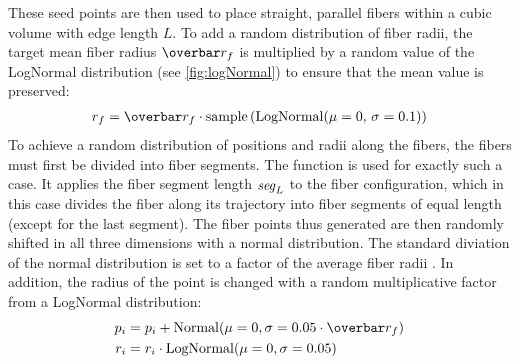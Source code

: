 %
These seed points are then used to place straight, parallel fibers within a cubic volume with edge length $L$.
To add a random distribution of fiber radii, the target mean fiber radius $\fiberRadiusMean$ is multiplied by a random value of the LogNormal distribution (see \cref{fig:logNormal}) to ensure that the mean value is preserved:
\begin{align}
\fiberRadius = \fiberRadiusMean \cdot \mathrm{sample}\left(\mathrm{LogNormal}(\mu=0, \, \sigma=0.1)\right)
\end{align}
%
To achieve a random distribution of positions and radii along the fibers, the fibers must first be divided into fiber segments.
The function  is used for exactly such a case.
It applies the fiber segment length $\textnormal{$\mathit{seg}_{L}$}$ to the fiber configuration, which in this case divides the fiber along its trajectory into fiber segments of equal length (except for the last segment).
The fiber points thus generated are then randomly shifted in all three dimensions with a normal distribution.
The standard diviation of the normal distribution is set to a factor of the average fiber radii \fiberRadiusMean{}.
In addition, the radius of the point is changed with a random multiplicative factor from a LogNormal distribution:
%
\begin{align}
\begin{split}
p_i &= p_i + \mathrm{Normal}(\mu=0,\sigma=0.05 \cdot \fiberRadiusMean)\\
r_i &= r_i \cdot \mathrm{LogNormal}(\mu=0,\sigma=0.05)
\end{split}
\end{align}
%
%
%
